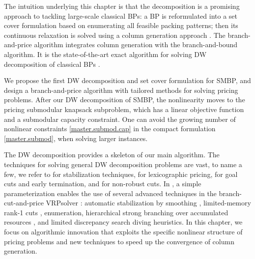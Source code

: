The intuition underlying this chapter is that the  decomposition is a promising approach to tackling large-scale classical BPs: a BP is reformulated into a set cover formulation based on enumerating all feasible packing patterns; then its continuous relaxation is solved using a column generation approach \citep{gilmore1961linear}. The branch-and-price algorithm integrates column generation with the branch-and-bound algorithm. It is the state-of-the-art exact algorithm for solving DW decomposition of classical BPs \citep{wei2020new, delorme2016bin}.


We propose the first DW decomposition and set cover formulation for SMBP, and design a branch-and-price algorithm with tailored methods for solving pricing problems. After our DW decomposition of SMBP,   the nonlinearity moves to the pricing submodular knapsack subproblem, which has a linear objective function and a submodular capacity constraint. One can avoid the growing number of nonlinear constraints \eqref{master.submod.cap} in the compact formulation \eqref{master.submod}, when solving larger instances.

The DW decomposition provides a skeleton of our main algorithm. The techniques for solving general DW decomposition problems  are vast, to name a few, we refer to \cite{frangioni2013stabilized} for stabilization techniques,  \cite{coniglio2019lexicographic} for lexicographic pricing, \cite{wei2020branch} for goal cuts and early termination, and \cite{jepsen2008subset} for non-robust cuts. 
In \cite{pessoa2021solving}, a simple parameterization enables the use of several  advanced techniques in the  branch-cut-and-price VRPsolver \cite{pessoa2020generic}: automatic stabilization
by smoothing \cite{pessoa2018automation}, limited-memory rank-1 cuts \cite{pecin2017improved}, enumeration, hierarchical strong branching over accumulated resources \cite{gelinas1995new}, and
limited discrepancy search diving heuristics.
In this chapter, we focus on algorithmic innovation that exploits the specific nonlinear structure of pricing problems and new techniques to speed  up the convergence of column generation.


